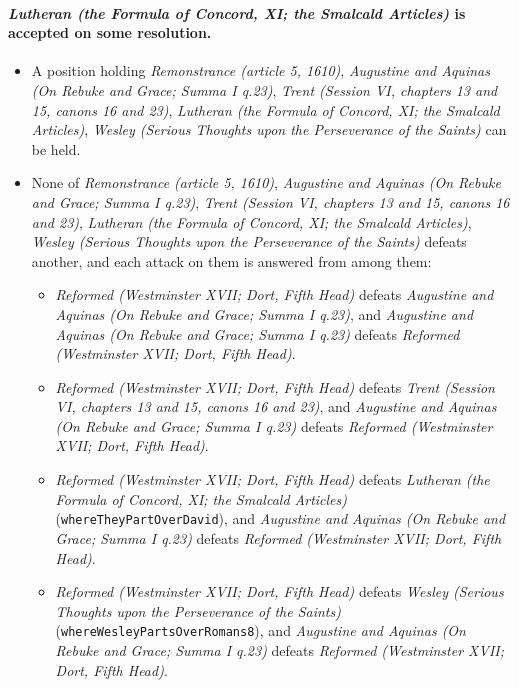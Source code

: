 \documentclass[11pt]{article}
\begin{document}
\paragraph{\emph{Lutheran (the Formula of Concord, XI; the Smalcald Articles)} is accepted on some resolution.}
\begin{itemize}
\item A position holding \emph{Remonstrance (article 5, 1610)}, \emph{Augustine and Aquinas (On Rebuke and Grace; Summa I q.23)}, \emph{Trent (Session VI, chapters 13 and 15, canons 16 and 23)}, \emph{Lutheran (the Formula of Concord, XI; the Smalcald Articles)}, \emph{Wesley (Serious Thoughts upon the Perseverance of the Saints)} can be held.
\item None of \emph{Remonstrance (article 5, 1610)}, \emph{Augustine and Aquinas (On Rebuke and Grace; Summa I q.23)}, \emph{Trent (Session VI, chapters 13 and 15, canons 16 and 23)}, \emph{Lutheran (the Formula of Concord, XI; the Smalcald Articles)}, \emph{Wesley (Serious Thoughts upon the Perseverance of the Saints)} defeats another, and each attack on them is answered from among them:
\begin{itemize}
\item \emph{Reformed (Westminster XVII; Dort, Fifth Head)} defeats \emph{Augustine and Aquinas (On Rebuke and Grace; Summa I q.23)}, and \emph{Augustine and Aquinas (On Rebuke and Grace; Summa I q.23)} defeats \emph{Reformed (Westminster XVII; Dort, Fifth Head)}.
\item \emph{Reformed (Westminster XVII; Dort, Fifth Head)} defeats \emph{Trent (Session VI, chapters 13 and 15, canons 16 and 23)}, and \emph{Augustine and Aquinas (On Rebuke and Grace; Summa I q.23)} defeats \emph{Reformed (Westminster XVII; Dort, Fifth Head)}.
\item \emph{Reformed (Westminster XVII; Dort, Fifth Head)} defeats \emph{Lutheran (the Formula of Concord, XI; the Smalcald Articles)} (\texttt{where\allowbreak{}They\allowbreak{}Part\allowbreak{}Over\allowbreak{}David}), and \emph{Augustine and Aquinas (On Rebuke and Grace; Summa I q.23)} defeats \emph{Reformed (Westminster XVII; Dort, Fifth Head)}.
\item \emph{Reformed (Westminster XVII; Dort, Fifth Head)} defeats \emph{Wesley (Serious Thoughts upon the Perseverance of the Saints)} (\texttt{where\allowbreak{}Wesley\allowbreak{}Parts\allowbreak{}Over\allowbreak{}Romans8}), and \emph{Augustine and Aquinas (On Rebuke and Grace; Summa I q.23)} defeats \emph{Reformed (Westminster XVII; Dort, Fifth Head)}.
\end{itemize}
\end{itemize}
\end{document}
